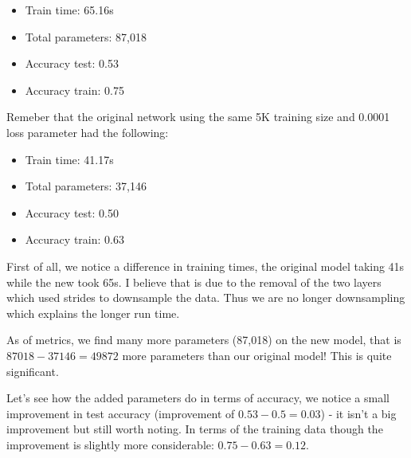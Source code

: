 \documentclass[10pt]{article}
\begin{document}
\begin{itemize}
    \item Train time: 65.16s
    \item Total parameters: 87,018
    \item Accuracy test: 0.53
    \item Accuracy train: 0.75
\end{itemize}

Remeber that the original network using the same 5K training size and 0.0001
loss parameter had the following:

\begin{itemize}
    \item Train time: 41.17s
    \item Total parameters: 37,146
    \item Accuracy test: 0.50
    \item Accuracy train: 0.63
\end{itemize}

First of all, we notice a difference in training times, the original model
taking 41s while the new took 65s. I believe that is due to the removal of the two
layers which used strides to downsample the data. Thus we are no longer downsampling
which explains the longer run time.

As of metrics, we find many more parameters (87,018) on the new model, that is
$87018 - 37146 = 49872$ more parameters than our original model! This is quite significant.

Let's see how the added parameters do in terms of accuracy, we notice a small
improvement in test accuracy (improvement of $0.53 - 0.5 = 0.03$) - it isn't a big improvement
but still worth noting.
In terms of the training data though the improvement is slightly more considerable: $0.75 - 0.63 = 0.12$.
\end{document}

